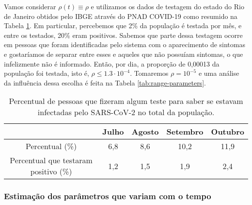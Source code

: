 \begin{obs.}
    \label{estimativa-rho}
    Vamos considerar $\rho(t) \equiv \rho$ e utilizamos os dados de testagem do estado do Rio de Janeiro obtidos pelo IBGE através do PNAD COVID-19
    \cite{ibge-pnad} como resumido na Tabela \ref{Tab:testing-rio}. 
    Em particular, percebemos que 2\% da população é testada por mês, e entre os testados, 20\% eram positivos. 
    Sabemos que parte dessa testagem ocorre em pessoas que foram identificadas pelo sistema com o aparecimento de sintomas e gostaríamos de separar entre esses e aqueles que não possuíam sintomas, o que infelizmente não é informado.
    Então, por dia, a proporção de 0,00013 da população foi testada, isto é, $\rho \le 1.3\cdot 10^{-4}$. 
    Tomaremos $\rho = 10^{-5}$ e uma análise da influência dessa escolha é
    feita na Tabela \ref{tab:range-parameters}.

    \begin{table}[ht]
        \centering
        \begin{tabular}{|c|c|c|c|c|}
        \hline
          & {\bf Julho} & {\bf Agosto}  & {\bf Setembro} & {\bf Outubro} \\[0.5ex]
        \hline
        Percentual (\%) & 6,8 & 8,6 & 10,2 & 11,9 \\
        \hline
        Percentual que testaram positivo (\%) & 1,2 & 1,5 & 1,9 & 2,4 \\
        \hline
        \end{tabular}
        \caption{Percentual de pessoas que fizeram
        algum teste para saber se estavam infectadas pelo SARS-CoV-2 no total da
        população. }
        \label{Tab:testing-rio}
    \end{table}
\end{obs.}

\subsubsection{Estimação dos parâmetros que variam com o tempo}
\label{estimativa-beta}

